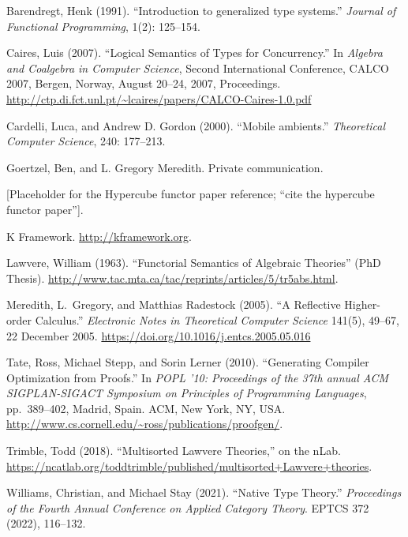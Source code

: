 \documentclass{article}
\begin{document}
\begin{thebibliography}{99}

Barendregt, Henk (1991). 
``Introduction to generalized type systems.''  
\emph{Journal of Functional Programming}, 1(2): 125--154.

Caires, Luis (2007). 
``Logical Semantics of Types for Concurrency.'' 
In \emph{Algebra and Coalgebra in Computer Science}, 
Second International Conference, CALCO 2007, Bergen, Norway, August 20--24, 2007, Proceedings.
\url{http://ctp.di.fct.unl.pt/~lcaires/papers/CALCO-Caires-1.0.pdf}

Cardelli, Luca, and Andrew D. Gordon (2000). ``Mobile ambients.'' \emph{Theoretical Computer Science}, 240: 177--213.

Goertzel, Ben, and L. Gregory Meredith. Private communication.

[Placeholder for the Hypercube functor paper reference; “cite the hypercube functor paper”].

K Framework.
\url{http://kframework.org}.

Lawvere, William (1963). 
``Functorial Semantics of Algebraic Theories'' (PhD Thesis). 
\url{http://www.tac.mta.ca/tac/reprints/articles/5/tr5abs.html}.

Meredith, L.~Gregory, and Matthias Radestock (2005). 
``A Reflective Higher-order Calculus.'' 
\emph{Electronic Notes in Theoretical Computer Science} 141(5), 49--67, 22 December 2005. 
\url{https://doi.org/10.1016/j.entcs.2005.05.016}

Tate, Ross, Michael Stepp, and Sorin Lerner (2010). 
``Generating Compiler Optimization from Proofs.'' 
In \emph{POPL '10: Proceedings of the 37th annual ACM SIGPLAN-SIGACT Symposium on Principles of Programming Languages}, 
pp.\ 389--402, Madrid, Spain. 
ACM, New York, NY, USA. 
\url{http://www.cs.cornell.edu/~ross/publications/proofgen/}.

Trimble, Todd (2018). 
``Multisorted Lawvere Theories,'' on the nLab. 
\url{https://ncatlab.org/toddtrimble/published/multisorted+Lawvere+theories}.

Williams, Christian, and Michael Stay (2021). ``Native Type Theory.'' \emph{Proceedings of the Fourth Annual Conference on Applied Category Theory}. EPTCS 372 (2022), 116--132.

\end{thebibliography}
\end{document}
